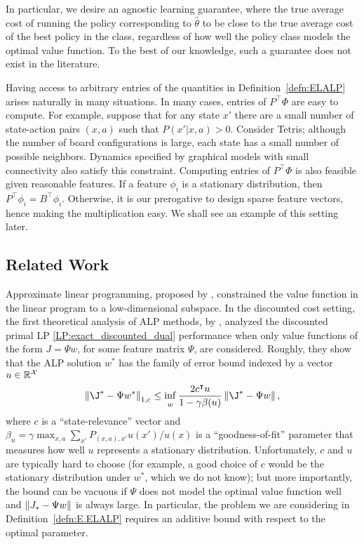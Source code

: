 \documentclass[11pt]{article}
\begin{document}
In particular, we desire an agnostic learning guarantee, where the true average cost of running the policy corresponding to $\widehat\theta$ to be close to the true average cost of the best policy in the class, regardless of how well the policy class models the optimal value function. To the best of our knowledge, such a guarantee does not exist in the literature.

Having access to arbitrary entries of the quantities in
Definition~\ref{defn:ELALP} arises naturally in many situations.
In many cases, entries of $P^\top\Phi$ are easy to compute.
For example, suppose that for any state $x'$ there are a small number of state-action pairs $(x,a)$ such that $P(x'|x,a)>0$. Consider Tetris; although the number of board configurations is large, each state has a small number of possible neighbors. Dynamics specified by graphical models with small connectivity also satisfy this constraint. Computing entries of $P^\top\Phi$ is also feasible given reasonable features. If a feature $\phi_i$ is a stationary distribution, then $P^\top\phi_i=B^\top \phi_i$. Otherwise, it is our prerogative to design sparse feature vectors, hence making the multiplication easy. We shall see an example of this setting later.


\subsection{Related Work}
Approximate linear programming, proposed by \cite{Schweitzer-Seidmann-1985}, constrained the value function in the linear program to a low-dimensional subspace. In the discounted cost setting, the first theoretical analysis of ALP methods, by \cite{DeFarias-VanRoy-2003}, analyzed the discounted primal LP \eqref{LP:exact_discounted_dual} performance
when only value functions of the form $J=\Psi w$, for some feature matrix $\Psi$, are considered. Roughly, they show that the ALP solution $w^*$ has the family of error bound indexed by a vector $u\in\mathbb R^{\cal X}$
\[
\norm{\J^*-\Psi w^*}_{1,c}\leq \inf_{w}\frac{2c^\top u}{1-\gamma\beta(u)}\norm{\J^*-\Psi w},
\]
where $c$ is a ``state-relevance'' vector and $\beta_u = \gamma \max_{x,a} \sum_{x'} P_{(x,a), x'} u(x')/u(x)$ is a ``goodness-of-fit'' parameter that measures how well $u$ represents a stationary distribution. Unfortunately, $c$ and $u$ are typically hard to choose (for example, a good choice of $c$ would be the stationary distribution under $w^*$, which we do not know); but more importantly, the bound can be vacuous if $\Psi$ does not model the optimal value function well and $\left\Vert J_* - \Psi w\right\Vert$ is always large. In particular, the problem we are considering in Definition~\ref{defn:E.ELALP} requires an additive bound with respect to the optimal parameter.
\end{document}
